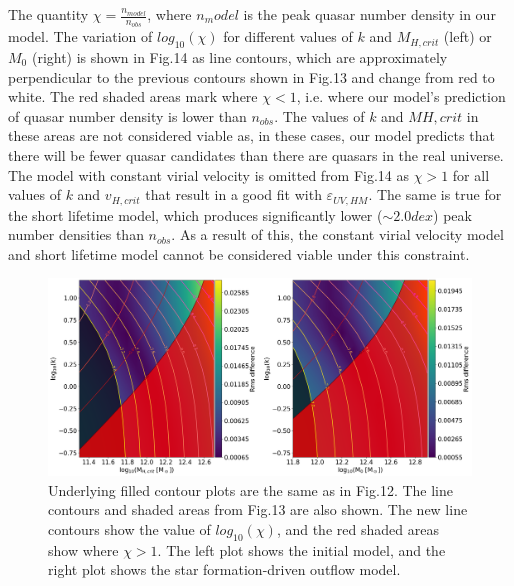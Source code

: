 \documentclass[12pt, twocolumn]{report}%
\begin{document}
The quantity $\chi=\frac{n_{model}}{n_{obs}}$, where $n_model$ is the peak quasar number density in our model. The variation of $log_{10}(\chi)$ for different values of $k$ and $M_{H,crit}$ (left) or $M_0$ (right) is shown in Fig.14 as line contours, which are approximately perpendicular to the previous contours shown in Fig.13 and change from red to white. The red shaded areas mark where $\chi<1$, i.e. where our model's prediction of quasar number density is lower than $n_{obs}$. The values of $k$ and $M{H,crit}$ in these areas are not considered viable as, in these cases, our model predicts that there will be fewer quasar candidates than there are quasars in the real universe. The model with constant virial velocity is omitted from Fig.14 as $\chi>1$ for all values of $k$ and $v_{H,crit}$ that result in a good fit with $\varepsilon_{UV,HM}$. The same is true for the short lifetime model, which produces significantly lower ($\sim2.0dex$) peak number densities than $n_{obs}$. As a result of this, the constant virial velocity model and short lifetime model cannot be considered viable under this constraint.

\onecolumngrid


\begin{figure}[H]
\centering
\includegraphics[width=\linewidth]{Contour_3.png}
\caption{Underlying filled contour plots are the same as in Fig.12. The line contours and shaded areas from Fig.13 are also shown. The new line contours show the value of $log_{10}(\chi)$, and the red shaded areas show where $\chi>1$. The left plot shows the initial model, and the right plot shows the star formation-driven outflow model.}
\label{fig:14}
\end{figure}

\twocolumngrid

\end{document}
